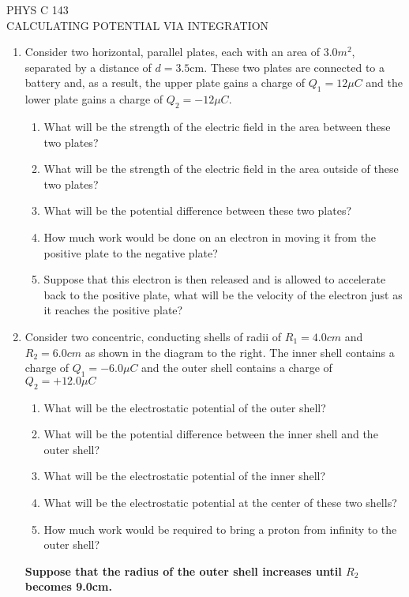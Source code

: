 \documentclass[12pt]{article}
\begin{document}
{\large PHYS C 143 \\ CALCULATING POTENTIAL VIA INTEGRATION}

\begin{enumerate}

\item Consider two horizontal, parallel plates, each with an area of 3.0$m^2$, separated by a distance of $d=3.5$cm.  These two plates are connected to a battery and, as a result, the upper plate gains a charge of $Q_{1} = 12\mu C$ and the lower plate gains a charge of $Q_{2} = -12\mu C$.
\begin{enumerate}
  \item What will be the strength of the electric field in the area between these two plates?
  \item What will be the strength of the electric field in the area outside of these two plates?
  \item What will be the potential difference between these two plates?
  \item How much work would be done on an electron in moving it from the positive plate to the negative plate?
  \item Suppose that this electron is then released and is allowed to accelerate back to the positive plate, what will be the velocity of the electron just as it reaches the positive plate?
\end{enumerate}

\item Consider two concentric, conducting shells of radii of $R_{1} = 4.0cm$ and $R_{2} = 6.0cm$ as shown in the diagram to the right. The inner shell contains a charge of $Q_{1} = -6.0\mu C$ and the outer shell contains a charge of $Q_{2} = +12.0 \mu C$
\begin{enumerate}
  \item What will be the electrostatic potential of the outer shell?
  \item What will be the potential difference between the inner shell and the outer shell?
  \item What will be the electrostatic potential of the inner shell?
  \item What will be the electrostatic potential at the center of these two shells?
  \item How much work would be required to bring a proton from infinity to the outer shell?
\end{enumerate}

\textbf{Suppose that the radius of the outer shell increases until $R_{2}$ becomes 9.0cm.}


\end{enumerate}
\end{document}

